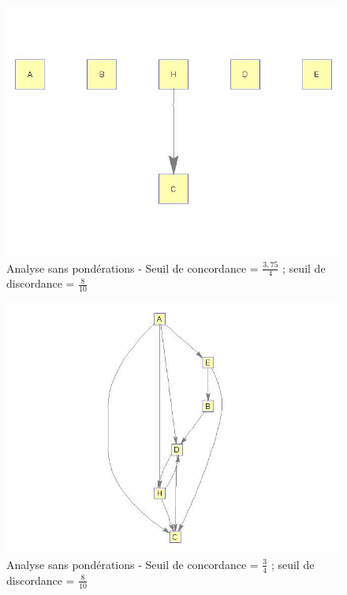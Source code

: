 \documentclass[a4paper,10pt]{article}
\begin{document}
\begin{figure}[H]
\begin{center}
\includegraphics[scale=0.3]{img/G1-neutre.jpg}
\caption{Analyse sans pondérations - Seuil de concordance = $\frac{3,75}{4}$ ; seuil de discordance = $\frac{8}{10}$}
\end{center}
\end{figure}

\begin{figure}[H]
\begin{center}
\includegraphics[scale=0.3]{img/G2-neutre.jpg}
\caption{Analyse sans pondérations - Seuil de concordance = $\frac{3}{4}$ ; seuil de discordance = $\frac{8}{10}$}
\end{center}
\end{figure}
\end{document}
